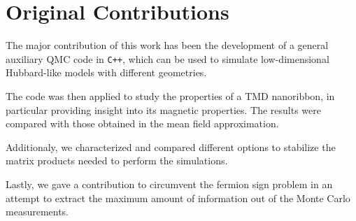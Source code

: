 \section{Original Contributions}
\label{sec:int_contributions}

The major contribution of this work has been the development of a general auxiliary \ac{QMC} code in \texttt{C++}, which can be used to simulate low-dimensional Hubbard-like models with different geometries.

The code was then applied to study the properties of a \ac{TMD} nanoribbon, in particular providing insight into its magnetic properties.
The results were compared with those obtained in the mean field approximation.

Additionaly, we characterized and compared different options to stabilize the matrix products needed to perform the simulations.

Lastly, we gave a contribution to circumvent the fermion sign problem in an attempt to extract the maximum amount of information out of the Monte Carlo measurements.
